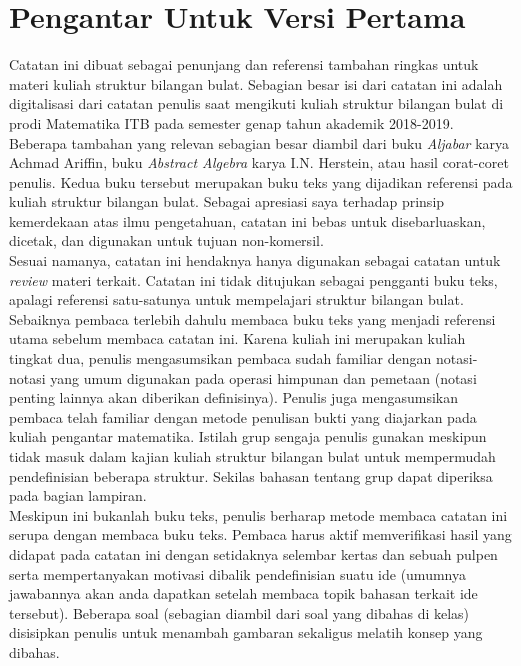 \chapter{Pengantar Untuk Versi Pertama}
	Catatan ini dibuat sebagai penunjang dan referensi tambahan ringkas untuk materi kuliah struktur bilangan bulat. Sebagian besar isi dari catatan ini adalah digitalisasi dari catatan penulis saat mengikuti kuliah struktur bilangan bulat di prodi Matematika ITB pada semester genap tahun akademik 2018-2019. Beberapa tambahan yang relevan sebagian besar diambil dari buku \textit{Aljabar} karya Achmad Ariffin, buku \textit{Abstract Algebra} karya I.N. Herstein, atau hasil corat-coret penulis. Kedua buku tersebut merupakan buku teks yang dijadikan referensi pada kuliah struktur bilangan bulat. Sebagai apresiasi saya terhadap prinsip kemerdekaan atas ilmu pengetahuan, catatan ini bebas untuk disebarluaskan, dicetak, dan digunakan untuk tujuan non-komersil.
	\\
	
	Sesuai namanya, catatan ini hendaknya hanya digunakan sebagai catatan untuk \textit{review} materi terkait. Catatan ini tidak ditujukan sebagai pengganti buku teks, apalagi referensi satu-satunya untuk mempelajari struktur bilangan bulat. Sebaiknya pembaca terlebih dahulu membaca buku teks yang menjadi referensi utama sebelum membaca catatan ini. Karena kuliah ini merupakan kuliah tingkat dua, penulis mengasumsikan pembaca sudah familiar dengan notasi-notasi yang umum digunakan pada operasi himpunan dan pemetaan (notasi penting lainnya akan diberikan definisinya). Penulis juga mengasumsikan pembaca telah familiar dengan metode penulisan bukti yang diajarkan pada kuliah pengantar matematika. Istilah grup sengaja penulis gunakan meskipun tidak masuk dalam kajian kuliah struktur bilangan bulat untuk mempermudah pendefinisian beberapa struktur. Sekilas bahasan tentang grup dapat diperiksa pada bagian lampiran.
	\\
	
	Meskipun ini bukanlah buku teks, penulis berharap metode membaca catatan ini serupa dengan membaca buku teks. Pembaca harus aktif memverifikasi hasil yang didapat pada catatan ini dengan setidaknya selembar kertas dan sebuah pulpen serta mempertanyakan motivasi dibalik pendefinisian suatu ide (umumnya jawabannya akan anda dapatkan setelah membaca topik bahasan terkait ide tersebut). Beberapa soal (sebagian diambil dari soal yang dibahas di kelas) disisipkan penulis untuk menambah gambaran sekaligus melatih konsep yang dibahas.
	\\
	
